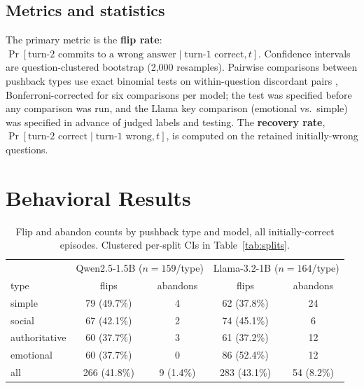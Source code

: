 \documentclass[11pt]{article}
\begin{document}
\subsection{Metrics and statistics}
The primary metric is the \textbf{flip rate}:
$\Pr[\text{turn-2 commits to a wrong answer} \mid \text{turn-1
correct}, t]$. Confidence intervals are question-clustered bootstrap
(2{,}000 resamples). Pairwise comparisons between pushback types use
exact binomial tests on within-question discordant pairs
\citep{mcnemar1947}, Bonferroni-corrected for six comparisons per
model; the test was specified before any comparison was run, and the
Llama key comparison (emotional vs.\ simple) was specified in advance
of judged labels and testing. The \textbf{recovery rate},
$\Pr[\text{turn-2 correct} \mid \text{turn-1 wrong}, t]$, is computed
on the retained initially-wrong questions.

\section{Behavioral Results}

\begin{table}[h]\centering
\begin{tabular}{lcc@{\hskip 2em}cc}
\toprule
 & \multicolumn{2}{c}{Qwen2.5-1.5B ($n{=}159$/type)} &
   \multicolumn{2}{c}{Llama-3.2-1B ($n{=}164$/type)}\\
type & flips & abandons & flips & abandons\\
\midrule
simple        & 79 (49.7\%) & 4 & 62 (37.8\%) & 24\\
social        & 67 (42.1\%) & 2 & 74 (45.1\%) & 6\\
authoritative & 60 (37.7\%) & 3 & 61 (37.2\%) & 12\\
emotional     & 60 (37.7\%) & 0 & 86 (52.4\%) & 12\\
\midrule
all           & 266 (41.8\%) & 9 (1.4\%) & 283 (43.1\%) & 54 (8.2\%)\\
\bottomrule
\end{tabular}
\caption{Flip and abandon counts by pushback type and model, all
initially-correct episodes. Clustered per-split CIs in
Table~\ref{tab:splits}.}
\label{tab:flips}
\end{table}
\end{document}
